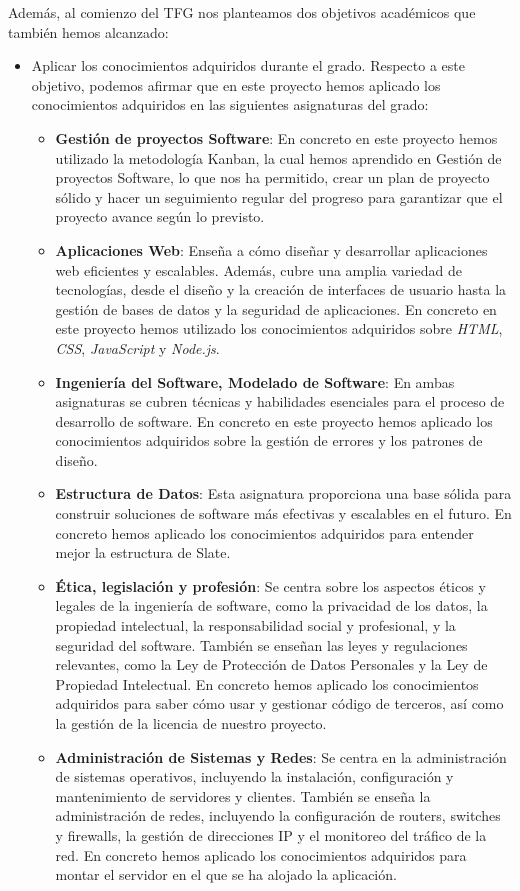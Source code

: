  Además, al comienzo del TFG nos planteamos dos objetivos académicos que también hemos alcanzado:
 \begin{itemize}
    \item Aplicar los conocimientos adquiridos durante el grado. Respecto a este objetivo, podemos afirmar que en este proyecto hemos aplicado los conocimientos adquiridos en las siguientes asignaturas del grado:
    \begin{itemize}
        \item \textbf{Gestión de proyectos Software}: En concreto en este proyecto hemos utilizado la metodología Kanban, la cual hemos aprendido en Gestión de proyectos Software, lo que nos ha permitido, crear un plan de proyecto sólido y hacer un seguimiento regular del progreso para garantizar que el proyecto avance según lo previsto.
        \item \textbf{Aplicaciones Web}: Enseña a cómo diseñar y desarrollar aplicaciones web eficientes y escalables. Además, cubre una amplia variedad de tecnologías, desde el diseño y la creación de interfaces de usuario hasta la gestión de bases de datos y la seguridad de aplicaciones. En concreto en este proyecto hemos utilizado los conocimientos adquiridos sobre \textit{HTML}, \textit{CSS}, \textit{JavaScript} y \textit{Node.js}.
        \item \textbf{Ingeniería del Software, Modelado de Software}: En ambas asignaturas se cubren técnicas y habilidades esenciales para el proceso de desarrollo de software. En concreto en este proyecto hemos aplicado los conocimientos adquiridos sobre la gestión de errores y los patrones de diseño.
        \item \textbf{Estructura de Datos}: Esta asignatura proporciona una base sólida para construir soluciones de software más efectivas y escalables en el futuro. En concreto hemos aplicado los conocimientos adquiridos para entender mejor la estructura de Slate.
        \item \textbf{Ética, legislación y profesión}: Se centra sobre los aspectos éticos y legales de la ingeniería de software, como la privacidad de los datos, la propiedad intelectual, la responsabilidad social y profesional, y la seguridad del software. También se enseñan las leyes y regulaciones relevantes, como la Ley de Protección de Datos Personales y la Ley de Propiedad Intelectual. En concreto hemos aplicado los conocimientos adquiridos para saber cómo usar y gestionar código de terceros, así como la gestión de la licencia de nuestro proyecto.
        \item \textbf{Administración de Sistemas y Redes}: Se centra en la administración de sistemas operativos, incluyendo la instalación, configuración y mantenimiento de servidores y clientes. También se enseña la administración de redes, incluyendo la configuración de routers, switches y firewalls, la gestión de direcciones IP y el monitoreo del tráfico de la red. En concreto hemos aplicado los conocimientos adquiridos para montar el servidor en el que se ha alojado la aplicación.

\end{itemize}
\end{itemize}
